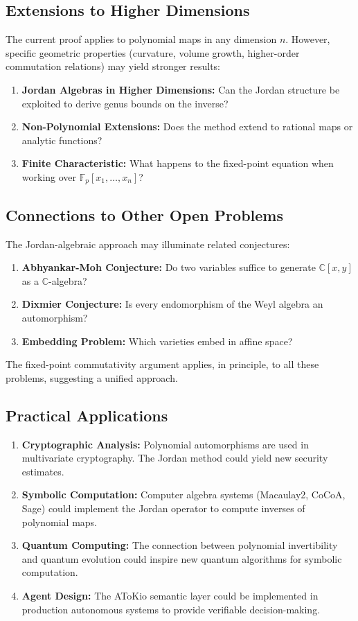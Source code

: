 \documentclass[11pt,a4paper]{article}
\theoremstyle{plain}
\theoremstyle{definition}
\newcommand{\CC}{\mathbb{C}}
\begin{document}
\subsection{Extensions to Higher Dimensions}

The current proof applies to polynomial maps in any dimension $n$. However, specific geometric properties (curvature, volume growth, higher-order commutation relations) may yield stronger results:

\begin{enumerate}
\item \textbf{Jordan Algebras in Higher Dimensions:} Can the Jordan structure be exploited to derive genus bounds on the inverse?
\item \textbf{Non-Polynomial Extensions:} Does the method extend to rational maps or analytic functions?
\item \textbf{Finite Characteristic:} What happens to the fixed-point equation when working over $\mathbb{F}_p[x_1, \ldots, x_n]$?
\end{enumerate}

\subsection{Connections to Other Open Problems}

The Jordan-algebraic approach may illuminate related conjectures:

\begin{enumerate}
\item \textbf{Abhyankar-Moh Conjecture:} Do two variables suffice to generate $\CC[x,y]$ as a $\CC$-algebra?
\item \textbf{Dixmier Conjecture:} Is every endomorphism of the Weyl algebra an automorphism?
\item \textbf{Embedding Problem:} Which varieties embed in affine space?
\end{enumerate}

The fixed-point commutativity argument applies, in principle, to all these problems, suggesting a unified approach.

\subsection{Practical Applications}

\begin{enumerate}
\item \textbf{Cryptographic Analysis:} Polynomial automorphisms are used in multivariate cryptography. The Jordan method could yield new security estimates.
\item \textbf{Symbolic Computation:} Computer algebra systems (Macaulay2, CoCoA, Sage) could implement the Jordan operator to compute inverses of polynomial maps.
\item \textbf{Quantum Computing:} The connection between polynomial invertibility and quantum evolution could inspire new quantum algorithms for symbolic computation.
\item \textbf{Agent Design:} The AToKio semantic layer could be implemented in production autonomous systems to provide verifiable decision-making.
\end{enumerate}
\end{document}

